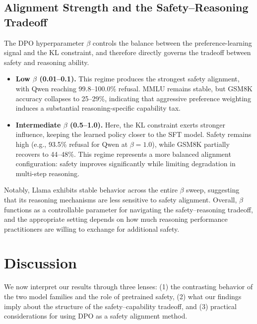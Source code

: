 \documentclass[a4paper, twocolumn, 9pt]{article}
\begin{document}
\subsection{Alignment Strength and the Safety--Reasoning Tradeoff}

The DPO hyperparameter $\beta$ controls the balance between the preference-learning
signal and the KL constraint, and therefore directly governs the tradeoff between
safety and reasoning ability.

\begin{itemize}
\item \textbf{Low $\beta$ (0.01--0.1).}
      This regime produces the strongest safety alignment, with Qwen reaching
      99.8--100.0\% refusal. MMLU remains stable, but GSM8K accuracy collapses to
      25--29\%, indicating that aggressive preference weighting induces a substantial
      reasoning-specific capability tax.

\item \textbf{Intermediate $\beta$ (0.5--1.0).}
      Here, the KL constraint exerts stronger influence, keeping the learned policy
      closer to the SFT model. Safety remains high (e.g., 93.5\% refusal for Qwen at
      $\beta=1.0$), while GSM8K partially recovers to 44--48\%. This regime represents
      a more balanced alignment configuration: safety improves significantly while
      limiting degradation in multi-step reasoning.

\end{itemize}

Notably, Llama exhibits stable behavior across the entire $\beta$ sweep, suggesting
that its reasoning mechanisms are less sensitive to safety alignment.
Overall, $\beta$ functions as a controllable parameter for navigating the
safety--reasoning tradeoff, and the appropriate setting depends on how much reasoning
performance practitioners are willing to exchange for additional safety.


\section{Discussion}
\label{sec:discussion}

We now interpret our results through three lenses:
(1) the contrasting behavior of the two model families and the role of pretrained safety,
(2) what our findings imply about the structure of the safety--capability tradeoff, and
(3) practical considerations for using DPO as a safety alignment method.
\end{document}
